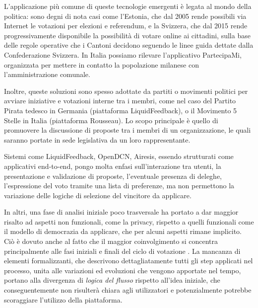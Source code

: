 \documentclass[12pt,a4paper,openright,twoside]{book}
\begin{document}
L'applicazione più comune di queste tecnologie emergenti è legata al mondo della politica\cite{aichholzer2020experience}:
sono degni di nota casi come l'Estonia, che dal 2005 rende possibili via Internet le votazioni
per elezioni e referendum, e la Svizzera, che dal 2015 rende progressivamente disponibile la possibilità di votare online
ai cittadini, sulla base delle regole operative che i Cantoni decidono seguendo le linee guida dettate 
dalla Confederazione Svizzera.
In Italia possiamo rilevare l'applicativo PartecipaMi,
organizzata per mettere in contatto la popolazione milanese con l'amministrazione comunale.\cite{WebsitePartecipaMi}

Inoltre, queste soluzioni sono spesso adottate da partiti o movimenti politici per avviare iniziative
e votazioni interne tra i membri, come nel caso del Partito Pirata tedesco in Germania (piattaforma LiquidFeedback),
o il Movimento 5 Stelle in Italia (piattaforma Rousseau). Lo scopo principale è quello di promuovere la discussione
di proposte tra i membri di un organizzazione, le quali saranno portate in sede legislativa da un loro rappresentante\cite{korthagen2020non}.

Sistemi come LiquidFeedback, OpenDCN, Airesis, essendo strutturati come applicativi end-to-end,
pongo molta enfasi sull'interazione tra utenti, la presentazione e validazione di proposte,
l'eventuale presenza di deleghe, l'espressione del voto tramite una lista di preferenze, ma
non permettono la variazione delle logiche di selezione del vincitore da applicare\cite{Trapanese:2018}.

In altri, una fase di analisi iniziale poco trasversale ha portato a dar maggior risalto
ad aspetti non funzionali, come la privacy, rispetto a quelli funzionali come il modello di democrazia
da applicare, che per alcuni aspetti rimane implicito\cite{Pianini:2019}.
Ciò è dovuto anche al fatto che il maggior coinvolgimento si concentra 
principalmente alle fasi iniziali e finali del ciclo di votazione \cite{hennen2020european}.
La mancanza di elementi formalizzanti, che descrivono dettagliatamente tutti gli step applicati nel
processo, unita alle variazioni ed evoluzioni che vengono apportate nel tempo, portano alla divergenza di \textit{logica del flusso} rispetto all'idea iniziale, 
che conseguentemente non risulterà chiara agli utilizzatori e potenzialmente potrebbe scoraggiare l'utilizzo della piattaforma\cite{Pianini:2019}.
\end{document}
